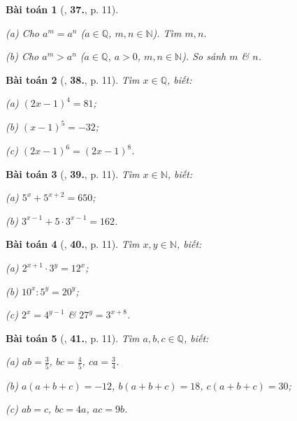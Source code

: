\documentclass{article}
\numberwithin{equation}{section}
\newtheorem{baitoan}{Bài toán}[section]
\begin{document}
\begin{baitoan}[\cite{Binh_Toan_7_tap_1}, \textbf{37.}, p. 11]
	\begin{enumerate*}
		\item[(a)] Cho $a^m = a^n$ ($a\in\mathbb{Q}$, $m,n\in\mathbb{N}$). Tìm $m,n$.
		\item[(b)] Cho $a^m > a^n$ ($a\in\mathbb{Q}$, $a > 0$, $m,n\in\mathbb{N}$). So sánh $m$ \& $n$.
	\end{enumerate*}
\end{baitoan}

\begin{baitoan}[\cite{Binh_Toan_7_tap_1}, \textbf{38.}, p. 11]
	Tìm $x\in\mathbb{Q}$, biết:
	\begin{enumerate*}
		\item[(a)] $(2x - 1)^4 = 81$;
		\item[(b)] $(x - 1)^5 = -32$;
		\item[(c)] $(2x - 1)^6 = (2x - 1)^8$.
	\end{enumerate*}
\end{baitoan}

\begin{baitoan}[\cite{Binh_Toan_7_tap_1}, \textbf{39.}, p. 11]
	Tìm $x\in\mathbb{N}$, biết:
	\begin{enumerate*}
		\item[(a)] $5^x + 5^{x+2} = 650$;
		\item[(b)] $3^{x-1} + 5\cdot 3^{x-1} = 162$.
	\end{enumerate*}
\end{baitoan}

\begin{baitoan}[\cite{Binh_Toan_7_tap_1}, \textbf{40.}, p. 11]
	Tìm $x,y\in\mathbb{N}$, biết:
	\begin{enumerate*}
		\item[(a)] $2^{x+1}\cdot 3^y = 12^x$;
		\item[(b)] $10^x:5^y = 20^y$;
		\item[(c)] $2^x = 4^{y-1}$ \& $27^y = 3^{x+8}$.
	\end{enumerate*}
\end{baitoan}

\begin{baitoan}[\cite{Binh_Toan_7_tap_1}, \textbf{41.}, p. 11]
	Tìm $a,b,c\in\mathbb{Q}$, biết:
	\begin{enumerate*}
		\item[(a)] $ab = \frac{3}{5}$, $bc = \frac{4}{5}$, $ca = \frac{3}{4}$.
		\item[(b)] $a(a + b + c) = -12$, $b(a + b + c) = 18$, $c(a + b + c) = 30$;
		\item[(c)] $ab = c$, $bc = 4a$, $ac = 9b$.
	\end{enumerate*}
\end{baitoan}
\end{document}
